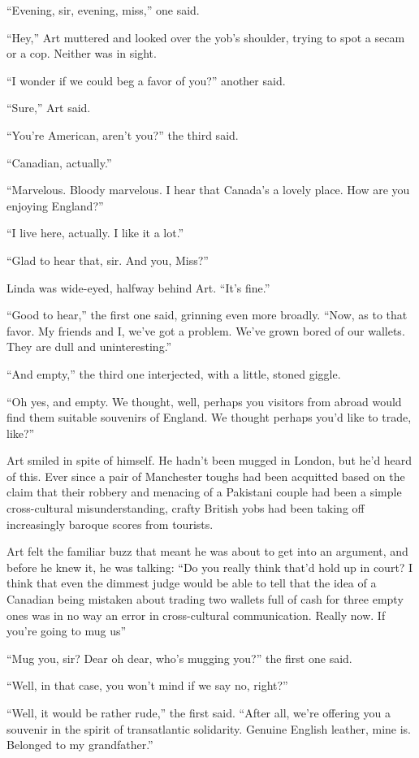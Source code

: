 “Evening, sir, evening, miss,” one said.

“Hey,” Art muttered and looked over the yob’s shoulder, trying to
spot a secam or a cop. Neither was in sight.

“I wonder if we could beg a favor of you?” another said.

“Sure,” Art said.

“You’re American, aren’t you?” the third said.

“Canadian, actually.”

“Marvelous. Bloody marvelous. I hear that Canada’s a lovely place.
How are you enjoying England?”

“I live here, actually. I like it a lot.”

“Glad to hear that, sir. And you, Miss?”

Linda was wide-eyed, halfway behind Art. “It’s fine.”

“Good to hear,” the first one said, grinning even more broadly.
“Now, as to that favor. My friends and I, we’ve got a problem.
We’ve grown bored of our wallets. They are dull and
uninteresting.”

“And empty,” the third one interjected, with a little, stoned
giggle.

“Oh yes, and empty. We thought, well, perhaps you visitors from
abroad would find them suitable souvenirs of England. We thought
perhaps you’d like to trade, like?”

Art smiled in spite of himself. He hadn’t been mugged in London,
but he’d heard of this. Ever since a pair of Manchester toughs had
been acquitted based on the claim that their robbery and menacing
of a Pakistani couple had been a simple cross-cultural
misunderstanding, crafty British yobs had been taking off
increasingly baroque scores from tourists.

Art felt the familiar buzz that meant he was about to get into an
argument, and before he knew it, he was talking: “Do you really
think that’d hold up in court? I think that even the dimmest judge
would be able to tell that the idea of a Canadian being mistaken
about trading two wallets full of cash for three empty ones was in
no way an error in cross-cultural communication. Really now. If
you’re going to mug us{\dash}”

“Mug you, sir? Dear oh dear, who’s mugging you?” the first one
said.

“Well, in that case, you won’t mind if we say no, right?”

“Well, it would be rather rude,” the first said. “After all, we’re
offering you a souvenir in the spirit of transatlantic solidarity.
Genuine English leather, mine is. Belonged to my grandfather.”

